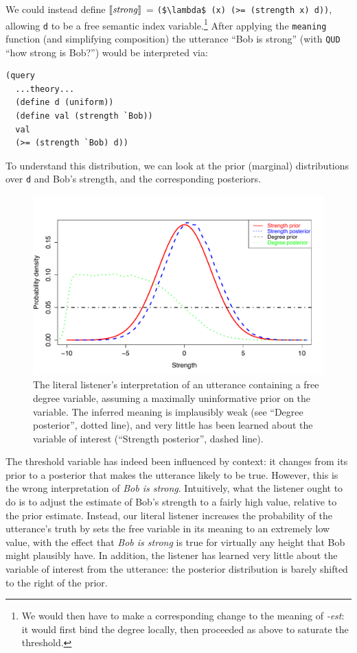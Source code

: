 \documentclass[pdfextras]{handbook}
\newcommand{\llbracket}{\ensuremath{\left [\!\left [}}%
\newcommand{\rrbracket}{\ensuremath{\right ]\!\right ]}}
\providecommand{\sv}[1]{\ensuremath{\llbracket \mathit{#1} \rrbracket}}
\begin{document}
We could instead define \sv{strong} = \lstinline[mathescape]{($\lambda$ (x) (>= (strength x) d))}, allowing \lstinline{d} to be a free semantic index variable.\footnote{We would then have to make a corresponding change
to the meaning of \emph{-est}: it would first bind the degree locally, then proceeded as above to saturate the threshold.}
 After applying the \lstinline{meaning} function (and simplifying composition) the utterance ``Bob is strong'' (with \lstinline{QUD} ``how strong is Bob?'') would be interpreted via:
\begin{lstlisting}
(query
  ...theory...
  (define d (uniform))
  (define val (strength `Bob))
  val
  (>= (strength `Bob) d))
\end{lstlisting}

To understand this distribution, we can look at 
the prior (marginal) distributions over \lstinline{d} and Bob's strength, and the corresponding posteriors.
\begin{figure}[tbh]
\begin{center}
\includegraphics[scale=.6]{strong-L0.pdf}
\end{center}
\caption{The literal listener's interpretation of an utterance containing a free degree variable, assuming a maximally uninformative prior on the variable. 
The inferred meaning is implausibly weak (see ``Degree posterior'', dotted line), and very little has been learned about the variable of interest (``Strength posterior'', dashed line).}
\end{figure}
The threshold variable has indeed been influenced by context: it changes from its prior to a posterior that makes the utterance likely to be true. 
However, this is the wrong interpretation of \emph{Bob is strong}. Intuitively, what the listener ought to do is to adjust the estimate of Bob's strength to a fairly high value, relative to the prior estimate. 
Instead, our literal listener increases the probability of the utterance's truth by sets the free variable in its meaning to an extremely low value, with the effect that \emph{Bob is strong} is true for virtually any height that Bob might plausibly have. 
In addition, the listener has learned very little about the variable of interest from the utterance: the posterior distribution is barely shifted to the right of the prior.
\end{document}
